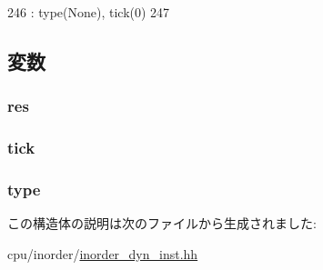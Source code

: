 \begin{DoxyCode}
246           : type(None), tick(0)
247         { }
\end{DoxyCode}


\subsection{変数}
\hypertarget{structInOrderDynInst_1_1InstResult_a24d6ff4df7cbbca5b395cf9e2801b555}{
\subsubsection[{res}]{ {\bf res}}}
\label{structInOrderDynInst_1_1InstResult_a24d6ff4df7cbbca5b395cf9e2801b555}
\hypertarget{structInOrderDynInst_1_1InstResult_a4daae57fbf09ee5423d123f5ce330e92}{
\subsubsection[{tick}]{ {\bf tick}}}
\label{structInOrderDynInst_1_1InstResult_a4daae57fbf09ee5423d123f5ce330e92}
\hypertarget{structInOrderDynInst_1_1InstResult_a878250d40c82c9e797f5219027794466}{
\subsubsection[{type}]{ {\bf type}}}
\label{structInOrderDynInst_1_1InstResult_a878250d40c82c9e797f5219027794466}


この構造体の説明は次のファイルから生成されました:\begin{DoxyCompactItemize}
\item 
cpu/inorder/\hyperlink{inorder__dyn__inst_8hh}{inorder\_\-dyn\_\-inst.hh}\end{DoxyCompactItemize}
